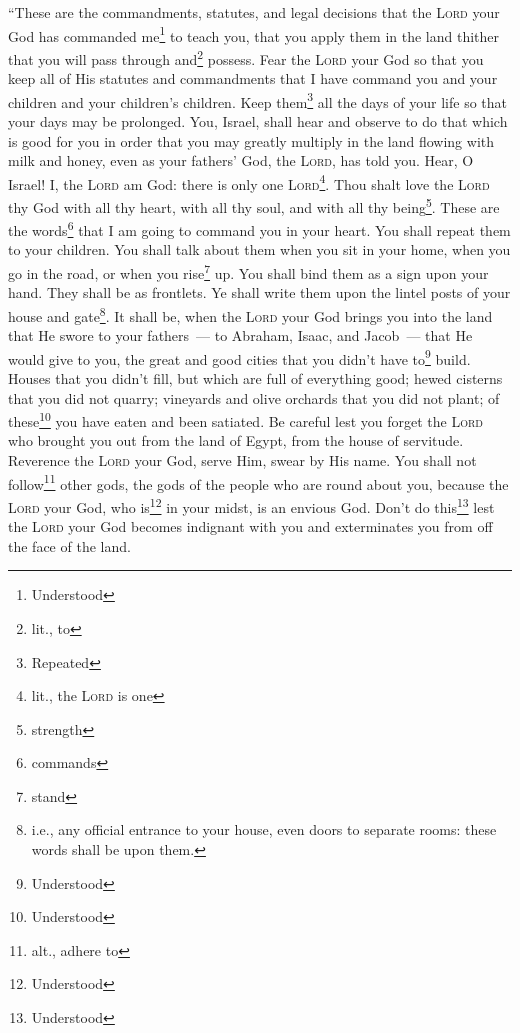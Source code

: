 
\begin{inparaenum}
     ``These are the commandments, statutes, and legal decisions that the \textsc{Lord} your God has commanded me\footnote{Understood} to teach you, that you apply them in the land thither that you will pass through and\footnote{lit., to} possess.%
     Fear the \textsc{Lord} your God so that you keep all of His statutes and commandments that I have command you and your children and your children's children. Keep them\footnote{Repeated} all the days of your life so that your days may be prolonged.%
     You, Israel, shall hear and observe to do that which is good for you in order that you may greatly multiply in the land flowing with milk and honey, even as your fathers' God, the \textsc{Lord}, has told you.%
     Hear, O Israel! I, the \textsc{Lord} am God: there is only one \textsc{Lord}\footnote{lit., the \textsc{Lord} is one}.%
     Thou shalt love the \textsc{Lord} thy God with all thy heart, with all thy soul, and with all thy being\footnote{strength}.%
     These are the words\footnote{commands} that I am going to command you in your heart.%
     You shall repeat them to your children. You shall talk about them when you sit in your home, when you go in the road, or when you rise\footnote{stand} up.%
     You shall bind them as a sign upon your hand. They shall be as frontlets.%
     Ye shall write them upon the lintel posts of your house and gate\footnote{i.e., any official entrance to your house, even doors to separate rooms: these words shall be upon them.}.%
     It shall be, when the \textsc{Lord} your God brings you into the land that He swore to your fathers~--- to Abraham, Isaac, and Jacob~--- that He would give to you, the great and good cities that you didn't have to\footnote{Understood} build.%
     Houses that you didn't fill, but which are full of everything good; hewed cisterns that you did not quarry; vineyards and olive orchards that you did not plant; of these\footnote{Understood} you have eaten and been satiated.%
     Be careful lest you forget the \textsc{Lord} who brought you out from the land of Egypt, from the house of servitude.%
     Reverence the \textsc{Lord} your God, serve Him, swear by His name.%
     You shall not follow\footnote{alt., adhere to} other gods, the gods of the people who are round about you,%
     because the \textsc{Lord} your God, who is\footnote{Understood} in your midst, is an envious God. Don't do this\footnote{Understood} lest the \textsc{Lord} your God becomes indignant with you and exterminates you from off the face of the land.%

\end{inparaenum}
